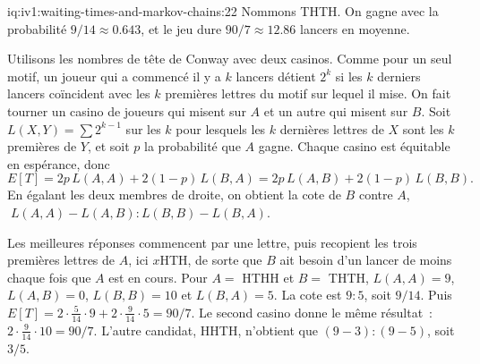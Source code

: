 \begin{solution}{iq:iv1:waiting-times-and-markov-chains:22}
Nommons THTH. On gagne avec la probabilité $9/14 \approx 0.643$, et le jeu dure $90/7 \approx 12.86$ lancers en moyenne.

Utilisons les nombres de tête de Conway avec deux casinos. Comme pour un seul motif, un joueur qui a commencé il y a $k$ lancers détient $2^k$ si les $k$ derniers lancers coïncident avec les $k$ premières lettres du motif sur lequel il mise. On fait tourner un casino de joueurs qui misent sur $A$ et un autre qui misent sur $B$. Soit $L(X, Y) = \sum 2^{k-1}$ sur les $k$ pour lesquels les $k$ dernières lettres de $X$ sont les $k$ premières de $Y$, et soit $p$ la probabilité que $A$ gagne. Chaque casino est équitable en espérance, donc
\[
E[T] = 2p\,L(A,A) + 2(1-p)\,L(B,A) = 2p\,L(A,B) + 2(1-p)\,L(B,B).
\]
En égalant les deux membres de droite, on obtient la cote de $B$ contre $A$, $\;L(A,A) - L(A,B) : L(B,B) - L(B,A)$.

Les meilleures réponses commencent par une lettre, puis recopient les trois premières lettres de $A$, ici $x$HTH, de sorte que $B$ ait besoin d'un lancer de moins chaque fois que $A$ est en cours. Pour $A = $ HTHH et $B = $ THTH, $L(A,A) = 9$, $L(A,B) = 0$, $L(B,B) = 10$ et $L(B,A) = 5$. La cote est $9:5$, soit $9/14$. Puis $E[T] = 2 \cdot \tfrac{5}{14} \cdot 9 + 2 \cdot \tfrac{9}{14} \cdot 5 = 90/7$. Le second casino donne le même résultat~: $2 \cdot \tfrac{9}{14} \cdot 10 = 90/7$. L'autre candidat, HHTH, n'obtient que $(9-3):(9-5)$, soit $3/5$.

\end{solution}

